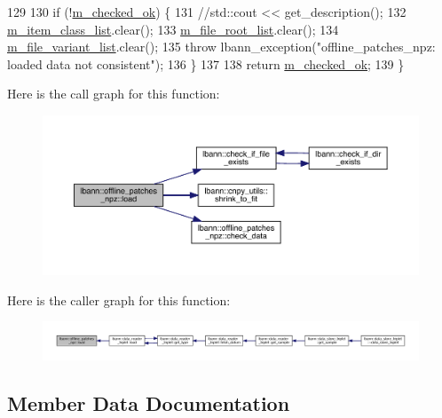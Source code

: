 \begin{DoxyCode}
129 
130   \textcolor{keywordflow}{if} (!\hyperlink{classlbann_1_1offline__patches__npz_ab434320c2084790a2c99257d6c39fc85}{m\_checked\_ok}) \{
131     \textcolor{comment}{//std::cout << get\_description();}
132     \hyperlink{classlbann_1_1offline__patches__npz_a5f90dc1b898f8ad9d7ea16c188738419}{m\_item\_class\_list}.clear();
133     \hyperlink{classlbann_1_1offline__patches__npz_a515ef05ef0679f3b6f1197d1ab47bfb3}{m\_file\_root\_list}.clear();
134     \hyperlink{classlbann_1_1offline__patches__npz_a164d2bd134dc8c3946dc28d6ec5da0ec}{m\_file\_variant\_list}.clear();
135     \textcolor{keywordflow}{throw} lbann\_exception(\textcolor{stringliteral}{"offline\_patches\_npz: loaded data not consistent"});
136   \}
137 
138   \textcolor{keywordflow}{return} \hyperlink{classlbann_1_1offline__patches__npz_ab434320c2084790a2c99257d6c39fc85}{m\_checked\_ok};
139 \}
\end{DoxyCode}
Here is the call graph for this function\+:\nopagebreak
\begin{figure}[H]
\begin{center}
\leavevmode
\includegraphics[width=350pt]{classlbann_1_1offline__patches__npz_a29f1d64e32c857018d5ef21dd99fe7c4_cgraph}
\end{center}
\end{figure}
Here is the caller graph for this function\+:\nopagebreak
\begin{figure}[H]
\begin{center}
\leavevmode
\includegraphics[width=350pt]{classlbann_1_1offline__patches__npz_a29f1d64e32c857018d5ef21dd99fe7c4_icgraph}
\end{center}
\end{figure}


\subsection{Member Data Documentation}
\mbox{\label{classlbann_1_1offline__patches__npz_ab434320c2084790a2c99257d6c39fc85}} 
